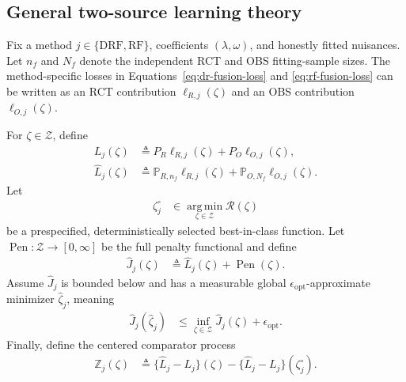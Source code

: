 
\subsection{General two-source learning theory}
\label{sec:cate-general-learning}

Fix a method $j\in\{\mathrm{DRF},\mathrm{RF}\}$, coefficients
$(\lambda,\omega)$, and honestly fitted nuisances.  Let $n_f$ and $N_f$
denote the independent RCT and OBS fitting-sample sizes.  The method-specific
losses in Equations~\eqref{eq:dr-fusion-loss} and
\eqref{eq:rf-fusion-loss} can be written as an RCT contribution
$\ell_{R,j}(\zeta)$ and an OBS contribution $\ell_{O,j}(\zeta)$.

\begin{definition}
For $\zeta\in\mathcal Z$, define
\begin{align*}
L_j(\zeta)
&\triangleq P_R\ell_{R,j}(\zeta)+P_O\ell_{O,j}(\zeta),\\
\widehat L_j(\zeta)
&\triangleq
\mathbb P_{R,n_f}\ell_{R,j}(\zeta)
+\mathbb P_{O,N_f}\ell_{O,j}(\zeta).
\end{align*}
Let
\begin{align*}
\zeta_j^\circ
&\in\operatorname*{arg\,min}_{\zeta\in\mathcal Z}\mathcal R(\zeta)
\end{align*}
be a prespecified, deterministically selected best-in-class function.  Let
$\operatorname{Pen}:\mathcal Z\to[0,\infty]$ be the full penalty functional
and define
\begin{align*}
\widehat J_j(\zeta)
&\triangleq\widehat L_j(\zeta)+\operatorname{Pen}(\zeta).
\end{align*}
Assume $\widehat J_j$ is bounded below and has a measurable global
$\epsilon_{\mathrm{opt}}$-approximate minimizer $\widehat\zeta_j$, meaning
\begin{align*}
\widehat J_j(\widehat\zeta_j)
&\leq\inf_{\zeta\in\mathcal Z}\widehat J_j(\zeta)
+\epsilon_{\mathrm{opt}}.
\end{align*}
Finally, define the centered comparator process
\begin{align*}
\mathbb Z_j(\zeta)
&\triangleq
\{\widehat L_j-L_j\}(\zeta)
-\{\widehat L_j-L_j\}(\zeta_j^\circ).
\end{align*}
\end{definition}

